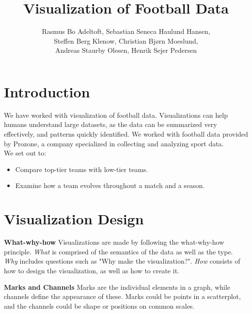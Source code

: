 \documentclass[portrait, a0,30pt]{sciposter}
\title{\fontsize{115}{5}\selectfont Visualization of Football Data}
\author{Rasmus Bo Adeltoft, 
Sebastian Seneca Haulund Hansen, \\
Steffen Berg Klenow, 
Christian Bjørn Moeslund, \\
Andreas Staurby Olesen, 
Henrik Sejer Pedersen}
\institute{Department of Mathematics and Computer Science, University of Southern Denmark}
\begin{document}

\begin{mdframed}[backgroundcolor=white,innertopmargin=2cm]

\maketitle
\end{mdframed}
\begin{multicols}{2}





\section*{Introduction}
\begin{mdframed}
We have worked with visualization of football data. Visualizations can help humans understand large datasets, as the data can be summarized very effectively, and patterns quickly identified. 
We worked with football data provided by Prozone, a company specialized in collecting and analyzing sport data. 
\\

We set out to:
\begin{itemize}
\item \hspace{10pt} Compare top-tier teams with low-tier teams.
\item \hspace{10pt} Examine how a team evolves throughout a match and a season.
\end{itemize}
\end{mdframed}
\section*{Visualization Design}
\begin{mdframed}
	\textbf{What-why-how}
	Visualizations are made by following the what-why-how principle. \emph{What} is comprised of the semantics of the data as well as the type. \emph{Why} includes questions such as "Why make the visualization?". \emph{How} consists of how to design the visualization, as well as how to create it.
	
	\textbf{Marks and Channels}
	Marks are the individual elements in a graph, while channels define the appearance of these. Marks could be points in a scatterplot, and the channels could be shape or positions on common scales. 
\end{mdframed}



\end{multicols}
\end{document}
